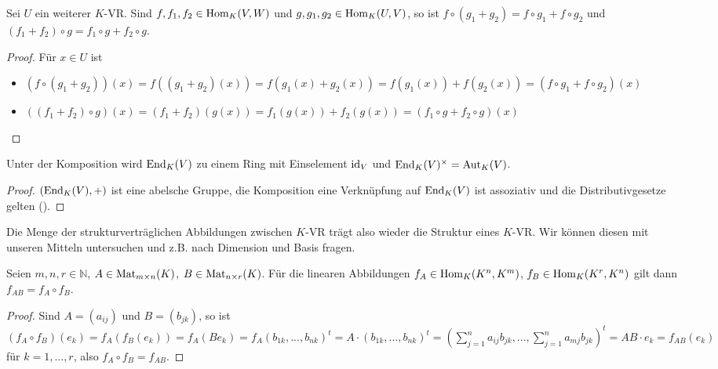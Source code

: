 \begin{lemma}
	Sei $U$ ein weiterer $K$-VR. Sind $f,f_1,f_2\in \operatorname{Hom}_K(V,W)$ und $g,g_1,g_2\in \operatorname{Hom}_K(U,V)$, so ist 
	$f\circ (g_1+g_2)=f\circ g_1+f\circ g_2$ und $(f_1+f_2)\circ g=f_1\circ g+f_2\circ g$.
\end{lemma}
\begin{proof}
	Für $x\in U$ ist
	\begin{itemize}
		\item $(f\circ(g_1+g_2))(x)=f((g_1+g_2)(x))=f(g_1(x)+g_2(x))=f(g_1(x))+f(g_2(x))=(f\circ g_1+f\circ g_2)(x)$
		\item $((f_1+f_2)\circ g)(x)=(f_1+f_2)(g(x))=f_1(g(x))+f_2(g(x))=(f_1\circ g+f_2\circ g)(x)$
	\end{itemize}
\end{proof}

\begin{conclusion}
	Unter der Komposition wird $\operatorname{End}_K(V)$ zu einem Ring mit Einselement $\operatorname{id}_V$ und $\operatorname{End}_K(V)^{\times}=
	\operatorname{Aut}_K(V)$.
\end{conclusion}
\begin{proof}
	$(\operatorname{End}_K(V),+)$ ist eine abelsche Gruppe, die Komposition eine Verknüpfung auf $\operatorname{End}_K(V)$ ist assoziativ und die 
	Distributivgesetze gelten ().
\end{proof}

\begin{remark}
	Die Menge der strukturverträglichen Abbildungen zwischen $K$-VR trägt also wieder die Struktur 
	eines $K$-VR. Wir können diesen mit unseren Mitteln untersuchen und z.B. nach Dimension und Basis fragen.
\end{remark}

\begin{lemma}
	Seien $m,n,r\in \mathbb N$, $A\in \operatorname{Mat}_{m\times n}(K)$, $B\in \operatorname{Mat}_{n\times r}(K)$. Für die linearen 
	Abbildungen $f_A\in \operatorname{Hom}_K(K^n,K^m)$, $f_B\in \operatorname{Hom}_K(K^r,K^n)$ gilt dann $f_{AB}=f_A\circ f_B$.
\end{lemma}
\begin{proof}
	Sind $A=(a_{ij})$ und $B=(b_{jk})$, so ist $(f_A\circ f_B)(e_k)=f_A(f_B(e_k))=f_A(Be_k)=f_A(b_{1k},...,b_{nk})^t=
	A\cdot (b_{1k},...,b_{nk})^t=(\sum_{j=1}^n a_{ij}b_{jk},...,\sum_{j=1}^n a_{mj}b_{jk})^t=AB\cdot e_k=
	f_{AB}(e_k)$ für $k=1,...,r$, also $f_A\circ f_B=f_{AB}$.
\end{proof}

